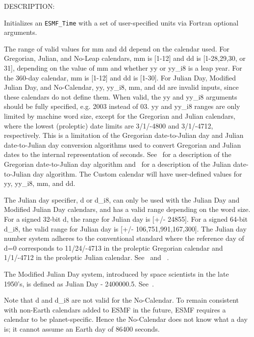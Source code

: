{\sf DESCRIPTION:\\ }


       Initializes an {\tt ESMF\_Time} with a set of user-specified units
       via Fortran optional arguments.
  
       The range of valid values for mm and dd depend on the calendar used.
       For Gregorian, Julian, and No-Leap calendars, mm is [1-12] and dd is
       [1-28,29,30, or 31], depending on the value of mm and whether yy or
       yy\_i8 is a leap year.  For the 360-day calendar, mm is [1-12] and dd is
       [1-30].  For Julian Day, Modified Julian Day, and No-Calendar,
       yy, yy\_i8, mm, and dd are invalid inputs, since these calendars do not
       define them.  When valid, the yy and yy\_i8 arguments should be fully
       specified, e.g. 2003 instead of 03.  yy and yy\_i8 ranges are only
       limited by machine word size, except for the Gregorian and Julian
       calendars, where the lowest (proleptic) date limits are 3/1/-4800 and
       3/1/-4712, respectively.  This is a limitation of the Gregorian
       date-to-Julian day and Julian date-to-Julian day conversion algorithms
       used to convert Gregorian and Julian dates to the internal representation
       of seconds.  See~\cite{Fli68} for a description of the Gregorian
       date-to-Julian day algorithm and~\cite{Hat84} for a description of the
       Julian date-to-Julian day algorithm.  The Custom calendar will have
       user-defined values for yy, yy\_i8, mm, and dd.
  
       The Julian day specifier, d or d\_i8, can only be used with the
       Julian Day and Modified Julian Day calendars, and has a valid range
       depending on the word size.  For a signed 32-bit d, the range for
       Julian day is [+/- 24855].  For a signed 64-bit d\_i8, the valid
       range for Julian day is [+/- 106,751,991,167,300].  The Julian day
       number system adheres to the conventional standard where the reference
       day of d=0 corresponds to 11/24/-4713 in the proleptic Gregorian calendar
       and 1/1/-4712 in the proleptic Julian calendar.  See~\cite{Meyer2} and
       ~\cite{JDNcalculator}.
  
       The Modified Julian Day system, introduced by space scientists in the late
       1950's, is defined as Julian Day - 2400000.5.  See~\cite{MJD}.
  
       Note that d and d\_i8 are not valid for the No-Calendar.  To remain
       consistent with non-Earth calendars added to ESMF in the future, ESMF
       requires a calendar to be planet-specific.  Hence the No-Calendar does
       not know what a day is; it cannot assume an Earth day of 86400 seconds.
  
